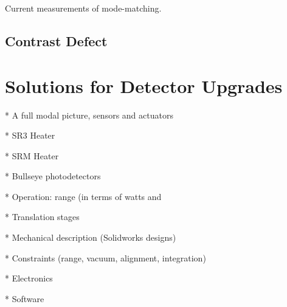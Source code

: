 \documentclass[oneside]{book}
\begin{document}
	Current measurements of mode-matching.
	
	\section{Contrast Defect}


\chapter{Solutions for Detector Upgrades} 

* A full modal picture, sensors and actuators

* SR3 Heater

* SRM Heater

* Bullseye photodetectors

* Operation: range (in terms of watts and %

* Translation stages

* Mechanical description (Solidworks designs)

* Constraints (range, vacuum, alignment, integration)

* Electronics 

* Software


	\listoffigures
	\listoftables
\end{document}
